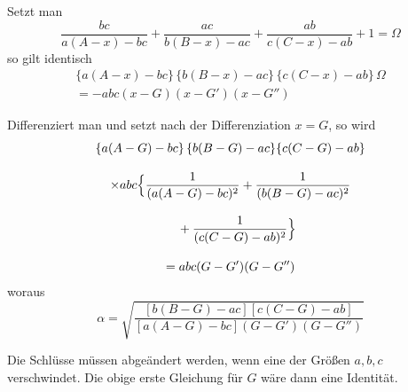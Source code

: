 
Setzt man
\[
\frac{bc}{a(A-x)-bc}+\frac{ac}{b(B-x)-ac}+\frac{ab}{c(C-x)-ab}+1=\Omega
\]
so gilt identisch
\[
\begin{gathered} \{a(A-x)-bc\}\,\{b(B-x)-ac\}\,\{c(C-x)-ab\}\,\Omega\\[9pt] =-abc(x-G)(x-G')(x-G'') \end{gathered}
\]


Differenziert man und setzt nach der Differenziation $x=G$, so wird
\[
\begin{gathered} \{a(A-G)-bc\}\,\{b(B-G)-ac\}\{c(C-G)-ab\}\\[9pt] \times abc\Bigl\{\frac{1}{(a(A-G)-bc)^2}+\frac{1}{(b(B-G)-ac)^2}\\[9pt]\quad{}+\frac{1}{(c(C-G)-ab)^2}\Bigr\}\\[9pt] =abc(G-G')(G-G'') \end{gathered}
\]
woraus
\[
\alpha=\surd{\frac{[b(B-G)-ac][c(C-G)-ab]}{[a(A-G)-bc](G-G')(G-G'')}}
\]

Die Schlüsse müssen abgeändert werden, wenn eine der Größen $a,b,c$
verschwindet. Die obige erste Gleichung für $G$ wäre dann eine Identität.

\clearpage
\endgroup

